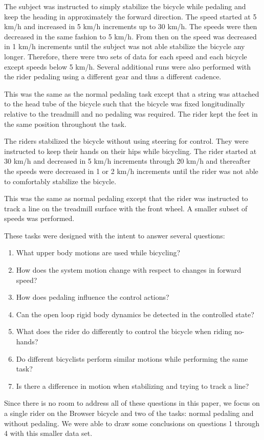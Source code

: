 \documentclass[smallextended]{svjour3}     %
\begin{document}
\begin{description}
 \item[Normal pedaling] The subject was instructed to simply stabilize the
     bicycle while pedaling and keep the heading in approximately the forward
     direction. The speed started at 5 km/h and increased in 5 km/h increments
     up to 30 km/h. The speeds were then decreased in the same fashion to 5
     km/h. From then on the speed was decreased in 1 km/h increments until the
     subject was not able stabilize the bicycle any longer. Therefore, there
     were two sets of data for each speed and each bicycle except speeds below
     5 km/h. Several additional runs were also performed with the rider
     pedaling using a different gear and thus a different cadence.
 \item[Without pedaling] This was the same as the normal pedaling task except
     that a string was attached to the head tube of the bicycle such that the
     bicycle was fixed longitudinally relative to the treadmill and no pedaling
     was required. The rider kept the feet in the same position throughout the
     task.
 \item[No-hands] The riders stabilized the bicycle without using steering for
     control. They were instructed to keep their hands on their hips while
     bicycling. The rider started at 30 km/h and decreased in 5 km/h increments
     through 20 km/h and thereafter the speeds were decreased in 1 or 2 km/h
     increments until the rider was not able to comfortably stabilize the
     bicycle.
 \item[Line tracking] This was the same as normal pedaling except that the
     rider was instructed to track a line on the treadmill surface with the
     front wheel. A smaller subset of speeds was performed.
\end{description}
These tasks were designed with the intent to answer several questions:
\begin{enumerate}
    \item What upper body motions are used while bicycling?
    \item How does the system motion change with respect to changes in forward speed?
    \item How does pedaling influence the control actions?
    \item Can the open loop rigid body dynamics be detected in the controlled state?
    \item What does the rider do differently to control the bicycle when riding no-hands?
    \item Do different bicyclists perform similar motions while performing the same task?
    \item Is there a difference in motion when stabilizing and trying to track a line?
\end{enumerate}
Since there is no room to address all of these questions in this paper, we
focus on a single rider on the Browser bicycle and two of the tasks: normal
pedaling and without pedaling. We were able to draw some conclusions on
questions 1 through 4 with this smaller data set.
\end{document}
